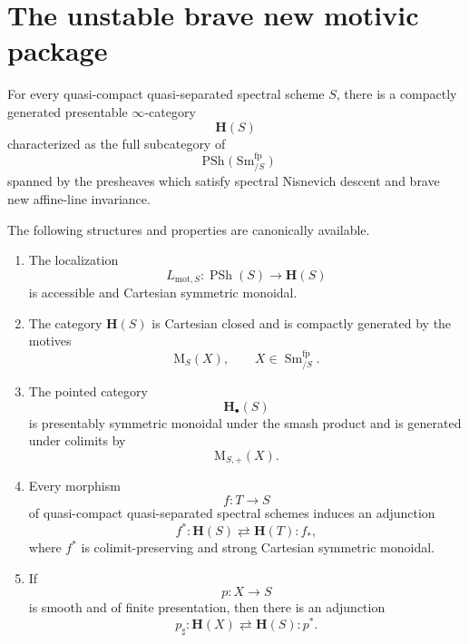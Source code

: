 \section{The unstable brave new motivic package}
\label{sec:unstable-brave-new-motivic-package}

\begin{theorem}
\label{thm:brave-new-motivic-spaces-package}
For every quasi-compact quasi-separated spectral scheme \(S\), there is
a compactly generated presentable \(\infty\)-category
\[
    \mathbf H(S)
\]
characterized as the full subcategory of
\[
    \operatorname{PSh}
    \bigl(
        \operatorname{Sm}^{\mathrm{fp}}_{/S}
    \bigr)
\]
spanned by the presheaves which satisfy spectral Nisnevich descent and
brave new affine-line invariance.

The following structures and properties are canonically available.
\begin{enumerate}[label=(\roman*)]
    \item The localization
    \[
        L_{\mathrm{mot},S}
        \colon
        \operatorname{PSh}(S)
        \longrightarrow
        \mathbf H(S)
    \]
    is accessible and Cartesian symmetric monoidal.

    \item The category \(\mathbf H(S)\) is Cartesian closed and is
    compactly generated by the motives
    \[
        \mathrm M_S(X),
        \qquad
        X\in\operatorname{Sm}^{\mathrm{fp}}_{/S}.
    \]

    \item The pointed category
    \[
        \mathbf H_\bullet(S)
    \]
    is presentably symmetric monoidal under the smash product and is
    generated under colimits by
    \[
        \mathrm M_{S,+}(X).
    \]

    \item Every morphism
    \[
        f
        \colon
        T
        \longrightarrow
        S
    \]
    of quasi-compact quasi-separated spectral schemes induces an
    adjunction
    \[
        f^*
        \colon
        \mathbf H(S)
        \rightleftarrows
        \mathbf H(T)
        :
        f_*,
    \]
    where \(f^*\) is colimit-preserving and strong Cartesian symmetric
    monoidal.

    \item If
    \[
        p
        \colon
        X
        \longrightarrow
        S
    \]
    is smooth and of finite presentation, then there is an adjunction
    \[
        p_\sharp
        \colon
        \mathbf H(X)
        \rightleftarrows
        \mathbf H(S)
        :
        p^*.
    \]


\end{enumerate}
\end{theorem}

